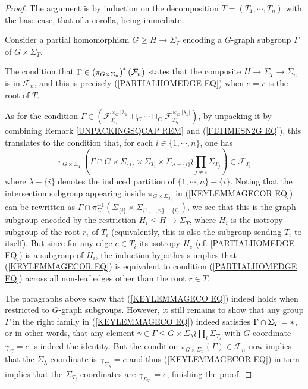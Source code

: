 \documentclass[a4paper,10pt]{article}%
\begin{document}
\begin{proof} The argument is by induction on the decomposition $T=(T_1,\cdots,T_n)$ with the base case, that of a corolla, being immediate.

  Consider a partial homomorphism $G \geq H \to \Sigma_T$ encoding a 
  $G$-graph subgroup $\Gamma$ of $G \times \Sigma_T$.
  
  The condition that $\Gamma \in \left(\pi_{G \times \Sigma_n}\right)^{\**}(\mathcal{F}_n)$ states that the composite $H \to \Sigma_T \to \Sigma_n$ is in $\mathcal{F}_n$, 
  and this is precisely (\ref{PARTIALHOMEDGE EQ}) when $e=r$ is the root of $T$.
  
  As for the condition 
  $ \Gamma \in 
  \left(
    \mathcal{F}_{T_{i_1}}^{\ltimes_G |\lambda_1|}
    \sqcap_G \cdots \sqcap_G
    \mathcal{F}_{T_{i_k}}^{\ltimes_G |\lambda_k|}
  \right)	$, by unpacking it by combining 
  Remark \ref{UNPACKINGSQCAP REM} and 
  (\ref{FLTIMESN2G EQ}), this translates to the condition that, for each $i \in \{1,\cdots,n\}$, one has
  \begin{equation}\label{KEYLEMMAGECOR EQ}
    \pi_{G \times \Sigma_{T_i}}
    \left(
      \Gamma \cap 
      G \times \Sigma_{\{i\}} \times \Sigma_{T_i}
      \times 
      \Sigma_{\lambda-\{i\}} \wr \prod_{j\neq i} \Sigma_{T_j}
    \right)	
    \in \mathcal{F}_{T_i}
  \end{equation}
  where $\lambda - \{i\}$ denotes the induced partition of 
  $\{1,\cdots,n\} - \{i\}$. Noting that the intersection subgroup appearing inside $\pi_{G \times \Sigma_{T_i}}$ in (\ref{KEYLEMMAGECOR EQ}) can be rewritten as 
  $\Gamma \cap \pi_{\Sigma_n}^{-1}
  (\Sigma_{\{i\}} \times \Sigma_{\{1,\cdots,n\} - \{i\}})$,
  we see that this is the graph subgroup encoded by the restriction $H_i \leq H \to \Sigma_T$, where $H_i$ is the isotropy subgroup of the root $r_i$ of $T_i$ (equivalently, this is also the subgroup sending $T_i$ to itself).
  But since for any edge $e \in T_i$ its isotropy $H_e$ 
  (cf. \ref{PARTIALHOMEDGE EQ}) is a subgroup of $H_i$, the induction hypothesis implies that (\ref{KEYLEMMAGECOR EQ})
  is equivalent to condition (\ref{PARTIALHOMEDGE EQ}) 
  across all non-leaf edges other than the root $r \in T$.

  The paragraphs above show that 
  (\ref{KEYLEMMAGECO EQ})
  indeed holds when restricted to $G$-graph subgroups. However, it still remains to show that any group $\Gamma$ in the right family in (\ref{KEYLEMMAGECO EQ}) indeed satisfies
  $\Gamma \cap \Sigma_T =\**$, or in other words, that any element $\gamma \in \Gamma \leq G \times \Sigma_{\lambda} \wr \prod_{i} \Sigma_{T_i}$ with $G$-coordinate 
  $\gamma_G = e$ is indeed the identity.
  But the condition 
  $\pi_{G \times \Sigma_n}(\Gamma) \in \mathcal{F}_n$ now implies that the $\Sigma_{\lambda}$-coordinate is $\gamma_{\Sigma_{\lambda}} = e$
  and thus (\ref{KEYLEMMAGECOR EQ}) in turn implies that the 
  $\Sigma_{T_i}$-coordinates are 
  $\gamma_{\Sigma_{T_i}} = e$,
  finishing the proof.
\end{proof}
\end{document}
